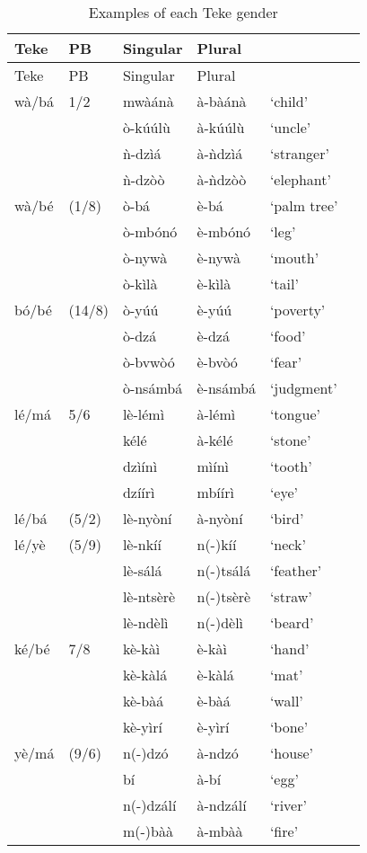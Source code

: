 \documentclass[output=paper,,modfonts,nonflat]{langsci/langscibook}
\begin{document}
{\small\begin{longtable}{llllll}
\caption{Examples of each Teke gender\label{table5}}\\
\lsptoprule Teke	&	PB	&	Singular	&	Plural	&	\\\midrule\endfirsthead\midrule Teke	&	PB	&	Singular	&	Plural	&	\\\midrule\endhead\lspbottomrule\endlastfoot\endfoot
wà/bá	&	1/2	&	mwàánà	&	à-bàánà	&	`child’	\\	
	&		&	ò-kúúlù	&	à-kúúlù	&	`uncle’	\\	
	&		&	ǹ-dzìá	&	à-ǹdzìá	&	`stranger’	\\	
	&		&	ǹ-dzòò	&	à-ǹdzòò	&	`elephant’	\\	[0.2cm]
wà/bé	&	(1/8)	&	ò-bá	&	è-bá	&	`palm tree’	\\	
	&		&	ò-mbónó	&	è-mbónó	&	`leg’	\\	
	&		&	ò-nywà	&	è-nywà	&	`mouth’	\\	
	&		&	ò-kìlà	&	è-kìlà	&	`tail’	\\	[0.2cm]
bó/bé	&	(14/8)	&	ò-yúú	&	è-yúú	&	`poverty’	\\	
	&		&	ò-dzá	&	è-dzá	&	`food’	\\	
	&		&	ò-bvwòó	&	è-bvòó	&	`fear’	\\	
	&		&	ò-nsámbá	&	è-nsámbá	&	`judgment’	\\	[0.2cm]
lé/má\footnotemark	&	5/6	&	lè-lémì	&	à-lémì	&	`tongue’	\\	
	&		&	kélé	&	à-kélé	&	`stone’	\\	
	&		&	dzìínì	&	mìínì	&	`tooth’	\\
	&		&	dzíírì	&	mbíírì	&	`eye’	\\	[0.2cm]
lé/bá	&	(5/2)	&	lè-nyòní	&	à-nyòní	&	`bird’	\\	[0.2cm]
lé/yè	&	(5/9)	&	lè-nkíí	&	n(-)kíí	&	`neck’	\\	
	&		&	lè-sálá	&	n(-)tsálá	&	`feather’	\\	
	&		&	lè-ntsèrè	&	n(-)tsèrè	&	`straw’	\\	
	&		&	lè-ndèlì	&	n(-)dèlì	&	`beard’	\\	[0.2cm]
ké/bé	&	7/8	&	kè-kàì	&	è-kàì	&	`hand’	\\	
	&		&	kè-kàlá	&	è-kàlá	&	`mat’	\\	
	&		&	kè-bàá	&	è-bàá	&	`wall’	\\	
	&		&	kè-yìrí	&	è-yìrí	&	`bone’	\\	[0.2cm]
yè/má	&	(9/6)	&	n(-)dzó	&	à-ndzó	&	`house’	\\	
	&		&	bí	&	à-bí	&	`egg’	\\	
	&		&	n(-)dzálí	&	à-ndzálí	&	`river’	\\	
	&		&	m(-)bàà	&	à-mbàà	&	`fire’	\\	
\end{longtable}}
\end{document}
